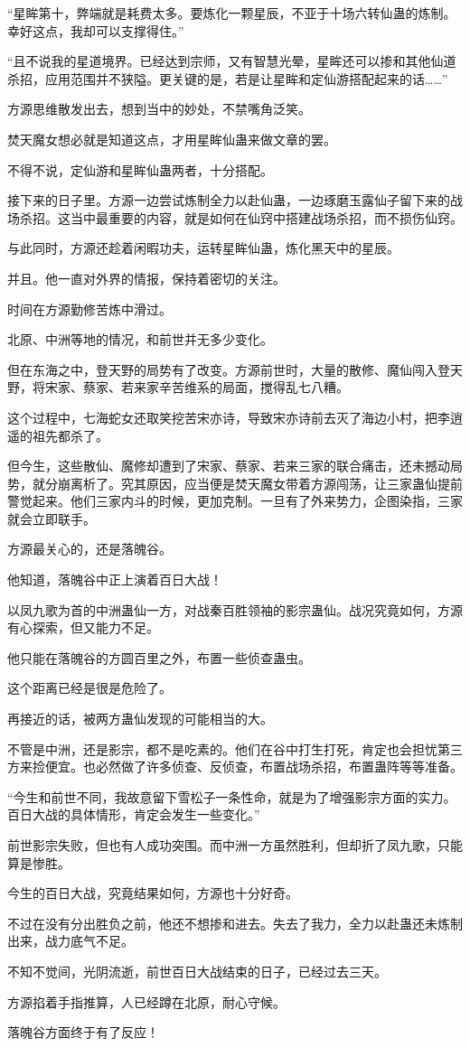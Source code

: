 \begin{this_body}
“星眸第十，弊端就是耗费太多。要炼化一颗星辰，不亚于十场六转仙蛊的炼制。幸好这点，我却可以支撑得住。”

“且不说我的星道境界。已经达到宗师，又有智慧光晕，星眸还可以掺和其他仙道杀招，应用范围并不狭隘。更关键的是，若是让星眸和定仙游搭配起来的话……”

方源思维散发出去，想到当中的妙处，不禁嘴角泛笑。

焚天魔女想必就是知道这点，才用星眸仙蛊来做文章的罢。

不得不说，定仙游和星眸仙蛊两者，十分搭配。

接下来的日子里。方源一边尝试炼制全力以赴仙蛊，一边琢磨玉露仙子留下来的战场杀招。这当中最重要的内容，就是如何在仙窍中搭建战场杀招，而不损伤仙窍。

与此同时，方源还趁着闲暇功夫，运转星眸仙蛊，炼化黑天中的星辰。

并且。他一直对外界的情报，保持着密切的关注。

时间在方源勤修苦炼中滑过。

北原、中洲等地的情况，和前世并无多少变化。

但在东海之中，登天野的局势有了改变。方源前世时，大量的散修、魔仙闯入登天野，将宋家、蔡家、若来家辛苦维系的局面，搅得乱七八糟。

这个过程中，七海蛇女还取笑挖苦宋亦诗，导致宋亦诗前去灭了海边小村，把李逍遥的祖先都杀了。

但今生，这些散仙、魔修却遭到了宋家、蔡家、若来三家的联合痛击，还未撼动局势，就分崩离析了。究其原因，应当便是焚天魔女带着方源闯荡，让三家蛊仙提前警觉起来。他们三家内斗的时候，更加克制。一旦有了外来势力，企图染指，三家就会立即联手。

方源最关心的，还是落魄谷。

他知道，落魄谷中正上演着百日大战！

以凤九歌为首的中洲蛊仙一方，对战秦百胜领袖的影宗蛊仙。战况究竟如何，方源有心探索，但又能力不足。

他只能在落魄谷的方圆百里之外，布置一些侦查蛊虫。

这个距离已经是很是危险了。

再接近的话，被两方蛊仙发现的可能相当的大。

不管是中洲，还是影宗，都不是吃素的。他们在谷中打生打死，肯定也会担忧第三方来捡便宜。也必然做了许多侦查、反侦查，布置战场杀招，布置蛊阵等等准备。

“今生和前世不同，我故意留下雪松子一条性命，就是为了增强影宗方面的实力。百日大战的具体情形，肯定会发生一些变化。”

前世影宗失败，但也有人成功突围。而中洲一方虽然胜利，但却折了凤九歌，只能算是惨胜。

今生的百日大战，究竟结果如何，方源也十分好奇。

不过在没有分出胜负之前，他还不想掺和进去。失去了我力，全力以赴蛊还未炼制出来，战力底气不足。

不知不觉间，光阴流逝，前世百日大战结束的日子，已经过去三天。

方源掐着手指推算，人已经蹲在北原，耐心守候。

落魄谷方面终于有了反应！

\end{this_body}

